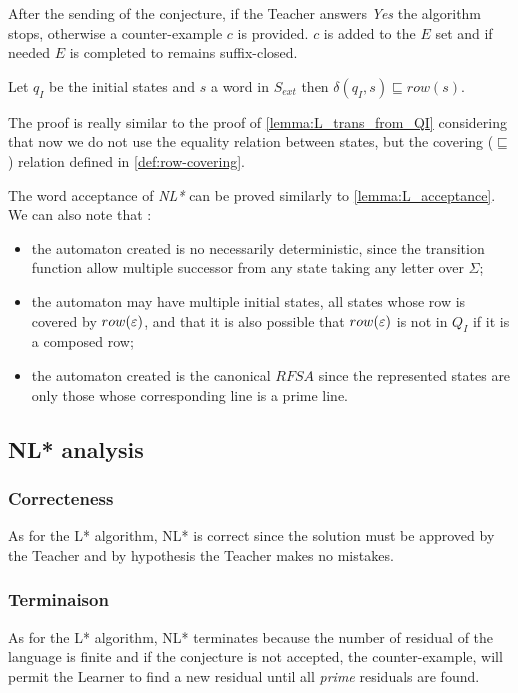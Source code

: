 After the sending of the conjecture, if the Teacher answers \textit{Yes} the algorithm stops, otherwise a counter-example $c$ is provided. $c$ is added to the $E$ set and if needed $E$ is completed to remains suffix-closed.

\begin{lemma}
  Let $q_I$ be the initial states and $s $ a word in $S_{ext}$ then $\delta(q_I, s) \sqsubseteq row(s)$.
\end{lemma}

The proof is really similar to the proof of \cref{lemma:L_trans_from_QI} considering that now we do not use the equality relation between states, but the covering ($\sqsubseteq$) relation defined in \cref{def:row-covering}.


The word acceptance of \textit{NL*} can be proved similarly to \cref{lemma:L_acceptance}. We can also note that :
\begin{itemize}
  \item the automaton created is no necessarily deterministic, since the transition function allow multiple successor from any state taking any letter over $\Sigma$;
  \item the automaton may have multiple initial states, all states whose row is covered by $row(\varepsilon)$, and that it is also possible that $row(\varepsilon)$ is not in $Q_I$ if it is a composed row;
  \item the automaton created is the canonical $RFSA$ since the represented states are only those whose corresponding line is a prime line.
\end{itemize}


\subsection{NL* analysis}
\subsubsection{Correcteness}
As for the L* algorithm, NL* is correct since the solution must be approved by the Teacher and by hypothesis the Teacher makes no mistakes.

\subsubsection{Terminaison}
As for the L* algorithm, NL* terminates because the number of residual of the language is finite and if the conjecture is not accepted, the counter-example, will permit the Learner to find a new residual until all \textit{prime} residuals are found.

